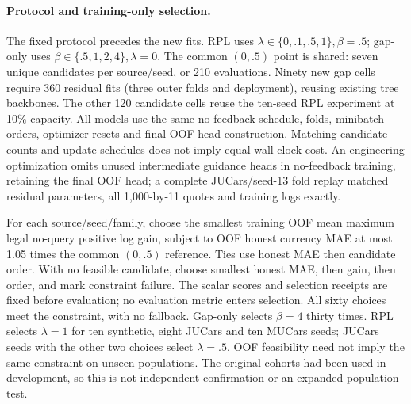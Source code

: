 \paragraph{Protocol and training-only selection.}
The fixed protocol precedes the new fits. RPL uses
$\lambda\in\{0,.1,.5,1\},\beta=.5$; gap-only uses
$\beta\in\{.5,1,2,4\},\lambda=0$. The common $(0,.5)$ point is shared:
seven unique candidates per source/seed, or 210 evaluations. Ninety new
gap cells require 360 residual fits (three outer folds and deployment),
reusing existing tree backbones. The other 120 candidate cells reuse the
ten-seed RPL experiment at 10\% capacity. All models use the same no-feedback
schedule, folds, minibatch orders, optimizer resets and final OOF head
construction. Matching candidate counts and update schedules does not imply
equal wall-clock cost. An engineering optimization omits unused intermediate
guidance heads in no-feedback training, retaining the final OOF head;
a complete JUCars/seed-13 fold replay matched residual parameters,
all 1,000-by-11 quotes and training logs exactly.

For each source/seed/family, choose the smallest training OOF mean maximum
legal no-query positive log gain, subject to OOF honest currency MAE at most
1.05 times the common $(0,.5)$ reference. Ties use honest MAE then candidate
order. With no feasible candidate, choose smallest honest MAE, then gain,
then order, and mark constraint failure. The scalar scores and selection
receipts are fixed before evaluation; no evaluation metric enters selection.
All sixty choices meet the constraint, with no fallback. Gap-only selects
$\beta=4$ thirty times. RPL selects $\lambda=1$ for ten synthetic, eight
JUCars and ten MUCars seeds; JUCars seeds with the other two choices select
$\lambda=.5$. OOF feasibility need not imply the same constraint on unseen
populations. The original cohorts had been used in development, so this is
not independent confirmation or an expanded-population test.

